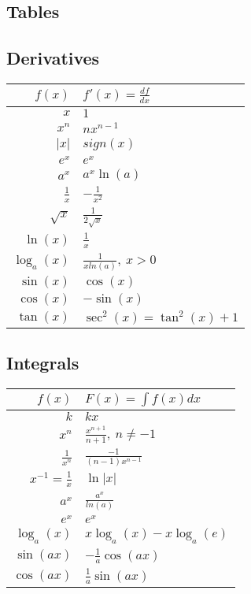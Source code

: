 \documentclass[8pt,a4paper]{extarticle}     %
\newcommand{\colfill}{\vfill\eject\columnbreak}
\newcommand{\colnull}{\vfill\null\columnbreak}
\begin{document}
\begin{multicols}{4}
\iffalse

\colfill
\section{Tables}
\subsection{Derivatives}

{\renewcommand{\arraystretch}{1.5}
\noindent
\begin{tabularx}{\hsize}{r|v}
	\hline
	$f(x)$ & $f'(x)=\frac{df}{dx}$ \\ 
	\hline 
	$x$ & $1$ \\
	$x^n$ & $nx^{n-1}$ \\ 
	$|x|$ & $sign(x)$ \\
	$e^x$ & $e^x$ \\
	$a^x$ & $a^x\ln(a)$ \\
	$\frac{1}{x}$ & $-\frac{1}{x^2}$ \\
	$\sqrt{x}$ & $\frac{1}{2\sqrt{x}}$ \\
	$\ln(x)$ & $\frac{1}{x}$ \\
	$\log_{a}(x)$ & $\frac{1}{xln(a)},\ x>0$ \\
	$\sin(x)$ & $\cos(x)$ \\
	$\cos(x)$ & $-\sin(x)$ \\
	$\tan(x)$ & $\sec^2(x) = \tan^2(x)+1$ \\
	\hline
\end{tabularx}}

\subsection{Integrals}
{\renewcommand{\arraystretch}{1.5}
\noindent 
\begin{tabularx}{\hsize}{r|v}
	\hline
	$f(x)$ & $F(x) = \int f(x)dx$ \\ 
	\hline
	$k$ & $kx$ \\
	$x^n$ & $\frac{x^{n+1}}{n+1}, \ n\neq-1$ \\
	$\frac{1}{x^n}$ & $\frac{-1}{(n-1)x^{n-1}}$ \\
	$x^{-1} = \frac{1}{x}$ & $\ln|x|$ \\
	$a^x $ & $\frac{a^x}{ln(a)}$ \\
	$e^x $ & $e^x$ \\
	$\log_a(x)$ & $x\log_a(x)-x\log_a(e)$ \\
	$\sin(ax)$ & $-\frac{1}{a}\cos(ax)$ \\
	$\cos(ax)$ & $\frac{1}{a}\sin(ax)$ \\
	\hline
\end{tabularx}}
\colnull

\end{multicols}
\end{document}
